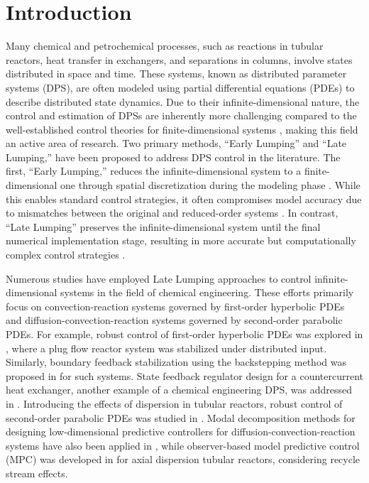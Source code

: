 \section{Introduction}

Many chemical and petrochemical processes, such as reactions in tubular reactors, heat transfer in exchangers, and separations in columns, involve states distributed in space and time. These systems, known as distributed parameter systems (DPS), are often modeled using partial differential equations (PDEs) to describe distributed state dynamics. Due to their infinite-dimensional nature, the control and estimation of DPSs are inherently more challenging compared to the well-established control theories for finite-dimensional systems \cite{ray1981advanced}, making this field an active area of research. Two primary methods, “Early Lumping” and “Late Lumping,” have been proposed to address DPS control in the literature. The first, “Early Lumping,” reduces the infinite-dimensional system to a finite-dimensional one through spatial discretization during the modeling phase \cite{davison1976robust}. While this enables standard control strategies, it often compromises model accuracy due to mismatches between the original and reduced-order systems \cite{moghadam2012infinite}. In contrast, “Late Lumping” preserves the infinite-dimensional system until the final numerical implementation stage, resulting in more accurate but computationally complex control strategies \cite{ray1981advanced}.

Numerous studies have employed Late Lumping approaches to control infinite-dimensional systems in the field of chemical engineering. These efforts primarily focus on convection-reaction systems governed by first-order hyperbolic PDEs and diffusion-convection-reaction systems governed by second-order parabolic PDEs. For example, robust control of first-order hyperbolic PDEs was explored in \cite{christofides1996feedback}, where a plug flow reactor system was stabilized under distributed input. Similarly, boundary feedback stabilization using the backstepping method was proposed in \cite{krstic2008backstepping} for such systems. State feedback regulator design for a countercurrent heat exchanger, another example of a chemical engineering DPS, was addressed in \cite{xu2016state}. Introducing the effects of dispersion in tubular reactors, robust control of second-order parabolic PDEs was studied in \cite{christofides1998robust}. Modal decomposition methods for designing low-dimensional predictive controllers for diffusion-convection-reaction systems have also been applied in \cite{dubljevic2006predictive2}, while observer-based model predictive control (MPC) was developed in \cite{Khatibi2021Model} for axial dispersion tubular reactors, considering recycle stream effects.

